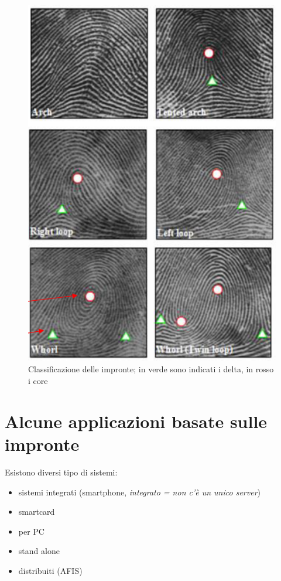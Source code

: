 \documentclass{report}
\begin{document}
\begin{figure}[ht]
    \centering
    \includegraphics[width=0.6\linewidth]{images/classificazione.png}
    \caption{Classificazione delle impronte; in verde sono indicati i delta, in rosso i core}
\end{figure}

\section{Alcune applicazioni basate sulle impronte}

Esistono diversi tipo di sistemi:
\begin{itemize}
    \item sistemi integrati (smartphone, \textit{integrato = non c'è un unico server})
    \item smartcard
    \item per PC
    \item stand alone
    \item distribuiti (AFIS)
\end{itemize}
\end{document}
